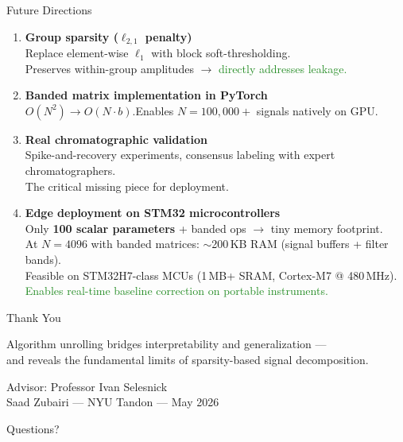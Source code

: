 \documentclass[aspectratio=169, 10pt]{beamer}
\begin{document}
\begin{frame}{Future Directions}
\begin{enumerate}
  \setlength\itemsep{0.6em}
  \item \textbf{Group sparsity ($\ell_{2,1}$ penalty)}\\
    {\small Replace element-wise $\ell_1$ with block soft-thresholding.\\
    Preserves within-group amplitudes $\rightarrow$ \textcolor{forestgreen}{directly addresses leakage.}}

  \item \textbf{Banded matrix implementation in PyTorch}\\
    {\small $O(N^2) \rightarrow O(N \cdot b)$.\quad Enables $N = 100{,}000+$ signals natively on GPU.}

  \item \textbf{Real chromatographic validation}\\
    {\small Spike-and-recovery experiments, consensus labeling with expert chromatographers.\\
    \textcolor{warningred}{The critical missing piece for deployment.}}

  \item \textbf{Edge deployment on STM32 microcontrollers}\\
    {\small Only \textbf{100 scalar parameters} + banded ops $\rightarrow$ tiny memory footprint.\\
    At $N\!=\!4096$ with banded matrices: ${\sim}$200\,KB RAM (signal buffers + filter bands).\\
    Feasible on STM32H7-class MCUs (1\,MB+ SRAM, Cortex-M7 @ 480\,MHz).\\
    \textcolor{forestgreen}{Enables real-time baseline correction on portable instruments.}}
\end{enumerate}
\end{frame}

\begin{frame}[standout]
  \Large Thank You

  \vspace{1em}
  \normalsize
  Algorithm unrolling bridges interpretability and generalization ---\\
  and reveals the fundamental limits of sparsity-based signal decomposition.

  \vspace{1.5em}
  \small
  Advisor: Professor Ivan Selesnick\\[0.3em]
  Saad Zubairi --- NYU Tandon --- May 2026

  \vspace{1.5em}
  \Large Questions?
\end{frame}
\end{document}
